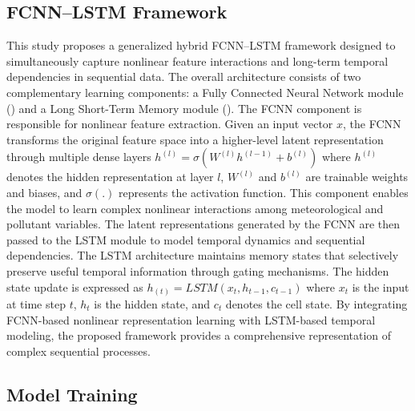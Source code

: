 \documentclass[twoside]{article}
\begin{document}
\subsection{FCNN–LSTM Framework}
This study proposes a generalized hybrid FCNN–LSTM framework designed to simultaneously capture nonlinear feature interactions and long-term temporal dependencies in sequential data. The overall architecture consists of two complementary learning components: a Fully Connected Neural Network module (\cite{LZ33}) and a Long Short-Term Memory module (\cite{LZ34}).
The FCNN component is responsible for nonlinear feature extraction. Given an input vector $x$, the FCNN transforms the original feature space into a higher-level latent representation through multiple dense layers $h^{(l)} = \sigma \left( W^{(l)} h^{(l-1)} + b^{(l)} \right)$  where $h^{(l) }$ denotes the hidden representation at layer $l$, $W^{(l)}$ and $b^{(l)}$ are trainable weights and biases, and $\sigma (.)$ represents the activation function. This component enables the model to learn complex nonlinear interactions among meteorological and pollutant variables.
The latent representations generated by the FCNN are then passed to the LSTM module to model temporal dynamics and sequential dependencies. The LSTM architecture maintains memory states that selectively preserve useful temporal information through gating mechanisms. The hidden state update is expressed as  $h_{(t)} = LSTM \left( x_{t},h_{t-1},c_{t-1} \right)$ 
where $x_{t}$ is the input at time step $t$, $h_{t}$ is the hidden state, and $c_{t}$ denotes the cell state.
By integrating FCNN-based nonlinear representation learning with LSTM-based temporal modeling, the proposed framework provides a comprehensive representation of complex sequential processes. 




\subsection{Model Training}
\end{document}

